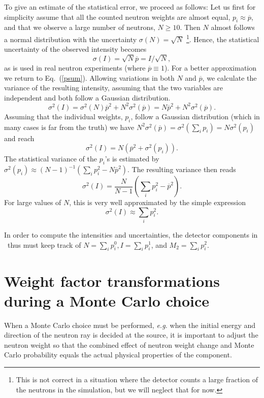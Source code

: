 To give an estimate of the statistical error, we proceed as follows:
Let us first for simplicity assume that all the counted neutron weights are
almost equal, $p_i \approx \overline{p}$,
and that we observe a large number of neutrons, $N \geq 10$.
Then $N$ almost follows a normal distribution
with the uncertainty $\sigma(N) = \sqrt{N}$
\footnote{This is not correct in a
situation where the detector counts a large fraction of the
neutrons in the simulation, but we will neglect that for now.}.
Hence, the statistical uncertainty of the observed intensity becomes
\begin{equation}
 \sigma(I) = \sqrt{N} \overline{p} = I / \sqrt{N} ,
\end{equation}
as is used in real neutron experiments (where $\overline{p} \equiv 1$).
For a better approximation we return to Eq.~(\ref{psum}).
Allowing variations in both $N$ and $\overline{p}$,
we calculate the variance of the resulting intensity,
assuming that the two variables are independent and both follow
a Gaussian distribution.
\begin{equation}
\sigma^2(I) = \sigma^2(N) \overline{p}^2 + N^2 \sigma^2(\overline{p})
            = N \overline{p}^2 + N^2 \sigma^2(\overline{p}) .
\end{equation}
Assuming that the individual weights, $p_i$, follow a Gaussian distribution
(which in many cases is far from the truth)
we have $N^2 \sigma^2(\overline{p}) = \sigma^2(\sum_i p_i) = N
\sigma^2(p_i)$
and reach
\begin{equation}
\sigma^2(I) = N \left( \overline{p}^2 + \sigma^2(p_i) \right).
\end{equation}
The statistical variance of the $p_i$'s is estimated by
$\sigma^2(p_i) \approx (N-1)^{-1} (\sum_i p_i^2 - N \overline{p}^2)$.
The resulting variance then reads
\begin{equation}
\sigma^2(I) = \frac{N}{N-1} \left( \sum_i p_i^2 - \overline{p}^2  \right) .
\end{equation}
For large values of $N$, this is very well approximated
by the simple expression
\begin{equation}
\sigma^2(I) \approx \sum_i p_i^2 .
\end{equation}

In order to compute the intensities and uncertainties, the detector components
in \MCS\ thus must keep track of
$N=\sum_i p_i^0, I=\sum_i p_i^1$, and $M_2 = \sum_i p_i^2$.

\section{Weight factor transformations during a Monte Carlo
 choice}
When a Monte Carlo choice must be performed, {\em e.g.} when the
initial energy and direction of the neutron ray is decided at the source,
it is important to adjust the neutron weight so that the combined
effect of neutron weight change and Monte Carlo probability
equals the actual physical properties of the component.

